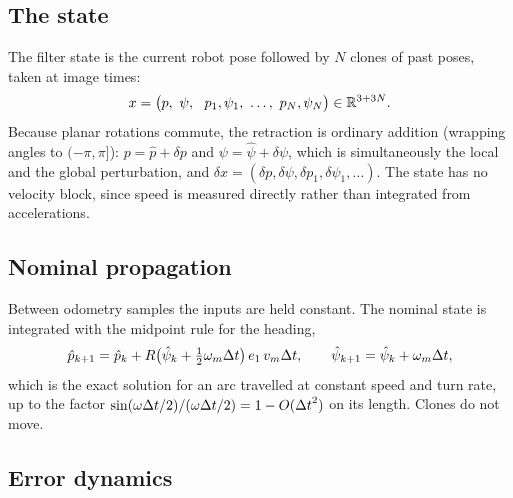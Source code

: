 \subsection{The state}

The filter state is the current robot pose followed by $N$ clones of past poses, taken at image times:
\begin{equation}
  x = \big(p,\ \psi,\ \ p_1, \psi_1,\ \dots,\ p_N, \psi_N\big) \in \mathbb{R}^{3 + 3N}.
\end{equation}
Because planar rotations commute, the retraction is ordinary addition (wrapping angles to $(-\pi, \pi]$): $p = \hat p + \delta p$ and
$\psi = \hat\psi + \delta\psi$, which is simultaneously the local and the global perturbation, and
$\delta x = (\delta p, \delta\psi, \delta p_1, \delta\psi_1, \dots)$. The state has no velocity block, since speed is measured directly rather than
integrated from accelerations.

\subsection{Nominal propagation}

Between odometry samples the inputs are held constant. The nominal state is integrated with the midpoint rule for the heading,
\begin{equation}
  \hat p_{k+1} = \hat p_k + R\big(\hat\psi_k + \tfrac12\omega_m{\Delta t}\big)\,e_1\,v_m{\Delta t}, \qquad \hat\psi_{k+1} = \hat\psi_k + \omega_m{\Delta t},
  \label{eq:planar-nominal}
\end{equation}
which is the exact solution for an arc travelled at constant speed and turn rate, up to the factor $\sin(\omega{\Delta t}/2)/(\omega{\Delta t}/2) = 1 - O({\Delta t}^2)$
on its length. Clones do not move.

\subsection{Error dynamics}

